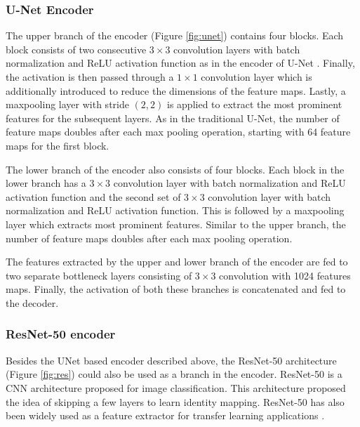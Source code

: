\documentclass[journal]{IEEEtran}
\begin{document}
\subsubsection{U-Net Encoder} 
\par The upper branch of the encoder (Figure \ref{fig:unet}) contains four blocks. Each block consists of two consecutive $3\times 3$ convolution layers with batch normalization and ReLU activation function as in the encoder of U-Net \cite{26}. Finally, the activation is then passed through a $1\times 1$ convolution layer which is additionally introduced to reduce the dimensions of the feature maps. Lastly, a maxpooling layer with stride $(2,2)$ is applied to extract the most prominent features for the subsequent layers. As in the traditional U-Net, the number of feature maps doubles after each max pooling operation, starting with 64 feature maps for the first block.  



The lower branch of the encoder also consists of four blocks. Each block in the lower branch has a $3 \times 3$ convolution layer with batch normalization and ReLU activation function and the second set of $3 \times 3$ convolution layer with batch normalization and ReLU activation function. This is followed by a maxpooling layer which extracts most prominent features.  Similar to the upper branch, the number of feature maps doubles after each max pooling operation. 


The features extracted by the upper and lower branch of the encoder are fed to two separate bottleneck layers consisting of $3 \times 3 $ convolution with 1024 features maps. Finally, the activation of both these branches is concatenated and fed to the decoder.



\subsubsection{ResNet-50 encoder}
\label{resnet} 
Besides the UNet based encoder described above, the ResNet-50 architecture (Figure \ref{fig:res}) could also be used as a branch in the encoder.  ResNet-50 is a CNN architecture proposed for image classification. This architecture proposed the idea of skipping a few layers to learn identity mapping.  ResNet-50 has also been widely used as a feature extractor for transfer learning applications \cite{he2016deep}.
\end{document}
